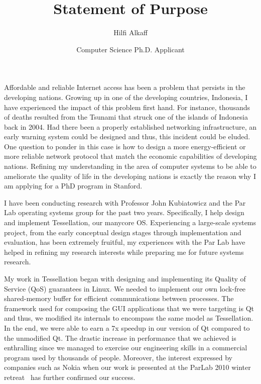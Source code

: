 \documentclass[11pt]{article}
\title{Statement of Purpose}
\author{Hilfi Alkaff}
\date{Computer Science Ph.D. Applicant}
\begin{document}
  \maketitle%

Affordable and reliable Internet access has been a problem that persists in the developing nations. Growing up in one of the developing countries, Indonesia, I have experienced the impact of this problem first hand. For instance, thousands of deaths resulted from the Tsunami that struck one of the islands of Indonesia back in 2004. Had there been a properly established networking infrastructure, an early warning system could be designed and thus, this incident could be eluded. One question to ponder in this case is how to design a more energy-efficient or more reliable network protocol that match the economic capabilities of developing nations. Refining my understanding in the area of computer systems to be able to ameliorate the quality of life in the developing nations is exactly the reason why I am applying for a PhD program in Stanford. \newline

I have been conducting research with Professor John Kubiatowicz and the Par Lab operating systems group for the past two years. Specifically, I help design and implement Tessellation, our manycore OS. Experiencing a large-scale systems project, from the early conceptual design stages through implementation and evaluation, has been extremely fruitful, my experiences with the Par Lab have helped in refining my research interests while preparing me for future systems research. \newline

My work in Tessellation began with designing and implementing its Quality of Service (QoS) guarantees in Linux. We needed to implement our own lock-free shared-memory buffer for efficient communications between processes. The framework used for composing the GUI applications that we were targeting is Qt and thus, we modified its internals to encompass the same model as Tessellation. In the end, we were able to earn a 7x speedup in our version of Qt compared to the unmodified Qt. The drastic increase in performance that we achieved is enthralling since we managed to exercise our engineering skills in a commercial program used by thousands of people. Moreover, the interest expressed by companies such as Nokia when our work is presented at the ParLab 2010 winter retreat~\cite{tess_retreat2010} has further confirmed our success. \newline
\end{document}
